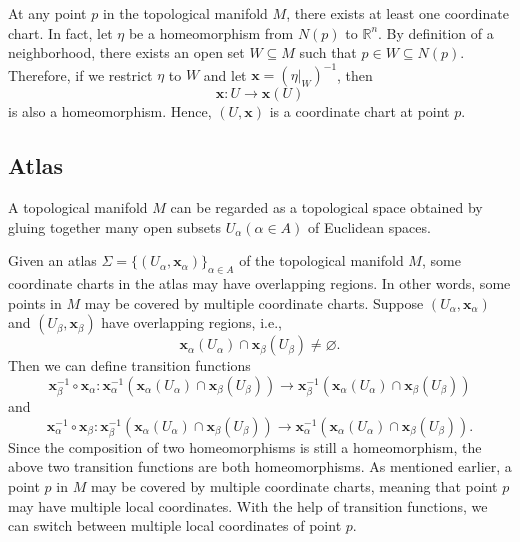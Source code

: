 \documentclass{report}
\begin{document}
At any point $p$ in the topological manifold $M$, there exists at least one coordinate chart. In fact, let $\eta$ be a homeomorphism from $N(p)$ to $\mathbb{R}^n$. By definition of a neighborhood, there exists an open set $W\subseteq M$ such that $p\in W\subseteq N(p)$. Therefore, if we restrict $\eta$ to $W$ and let $\mathbf{x}=(\left.\eta\right|_{W})^{-1}$, then
$$
    \mathbf{x}:U\longrightarrow \mathbf{x}(U)
$$
is also a homeomorphism. Hence, $(U,\mathbf{x})$ is a coordinate chart at point $p$.

\subsection{Atlas}
A topological manifold $M$ can be regarded as a topological space obtained by gluing together many open subsets $U_\alpha(\alpha\in A)$ of Euclidean spaces.

Given an atlas $\Sigma=\{(U_\alpha,\mathbf{x}_\alpha)\}_{\alpha\in
    A}$ of the topological manifold $M$, some coordinate charts in the atlas may have overlapping regions. In other words, some points in $M$ may be covered by multiple coordinate charts. Suppose $(U_\alpha,\mathbf{x}_\alpha)$ and $(U_\beta,\mathbf{x}_\beta)$ have overlapping regions, i.e.,
\[
    \mathbf{x}_\alpha(U_\alpha)\cap \mathbf{x}_\beta(U_\beta)\ne\varnothing.
\]
Then we can define transition functions
\[
    \mathbf{x}^{-1}_\beta\circ \mathbf{x}_{\alpha}:
    \mathbf{x}^{-1}_\alpha(\mathbf{x}_\alpha(U_\alpha)\cap
    \mathbf{x}_\beta(U_\beta)) \longrightarrow
    \mathbf{x}^{-1}_\beta(\mathbf{x}_\alpha(U_\alpha)\cap
    \mathbf{x}_\beta(U_\beta))
\]
and
\[
    \mathbf{x}^{-1}_{\alpha}\circ
    \mathbf{x}_\beta:  \mathbf{x}^{-1}_\beta(\mathbf{x}_\alpha(U_\alpha)\cap
    \mathbf{x}_\beta(U_\beta))\longrightarrow
    \mathbf{x}^{-1}_\alpha(\mathbf{x}_\alpha(U_\alpha)\cap
    \mathbf{x}_\beta(U_\beta)).
\]
Since the composition of two homeomorphisms is still a homeomorphism, the above two transition functions are both homeomorphisms. As mentioned earlier, a point $p$ in $M$ may be covered by multiple coordinate charts, meaning that point $p$ may have multiple local coordinates. With the help of transition functions, we can switch between multiple local coordinates of point $p$.
\end{document}
